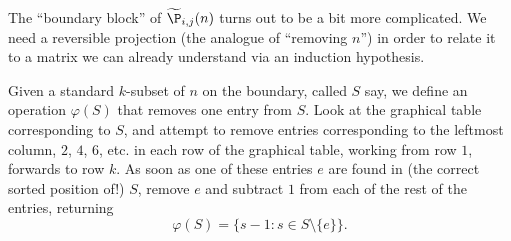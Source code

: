 The ``boundary block'' of $\widetilde\P_{i,j}(n)$ turns out to be a bit more complicated.  We need a reversible projection (the analogue of ``removing $n$'') in order to relate it to a matrix we can already understand via an induction hypothesis.

\begin{definition}\label{d:phi}
Given a standard $k$-subset of $n$ on the boundary, called $S$ say, we define an operation $\varphi(S)$ that removes one entry from $S$.  Look at the graphical table corresponding to $S$, and attempt to remove entries corresponding to the leftmost column, $2$, $4$, $6$, etc. in each row of the graphical table, working from row $1$, forwards to row $k$.  As soon as one of these entries $e$ are found in (the correct sorted position of!) $S$, remove $e$ and subtract $1$ from each of the rest of the entries, returning 
\[ \varphi(S) = \{ s-1 : s \in S \setminus \{e\} \}. \]
\end{definition}

